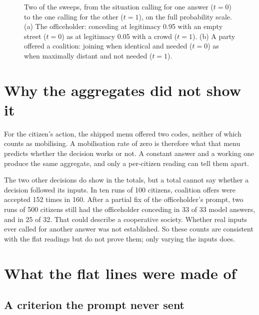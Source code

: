 \documentclass[11pt]{article}
\begin{document}
\begin{figure}[t]
\caption{Two of the sweeps, from the situation calling for one answer ($t=0$) to the one calling
for the other ($t=1$), on the full probability scale. (a) The officeholder: conceding at
legitimacy 0.95 with an empty street ($t=0$) as at legitimacy 0.05 with a crowd ($t=1$). (b) A
party offered a coalition: joining when identical and needed ($t=0$) as when maximally distant and
not needed ($t=1$).}
\label{fig:sweeps}
\end{figure}

\section{Why the aggregates did not show it}
\label{sec:aggregates}

For the citizen's action, the shipped menu offered two codes, neither of which counts as
mobilising. A mobilisation rate of zero is therefore what that menu predicts whether the decision
works or not. A constant answer and a working one produce the same aggregate, and only a
per-citizen reading can tell them apart.

The two other decisions do show in the totals, but a total cannot say whether a decision followed
its inputs. In ten runs of 100 citizens, coalition offers were accepted 152 times in 160. After a
partial fix of the officeholder's prompt, two runs of 500 citizens still had the officeholder
conceding in 33 of 33 model answers, and in 25 of 32. That could describe a cooperative
society. Whether real inputs ever called for another answer was not established. So these counts
are consistent with the flat readings but do not prove them; only varying the inputs does.

\section{What the flat lines were made of}
\label{sec:diagnosis}

\subsection{A criterion the prompt never sent}
\end{document}
